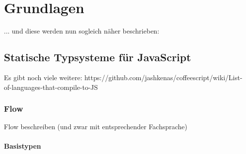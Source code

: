 \chapter{Grundlagen}

... und diese werden nun sogleich näher beschrieben:

\section{Statische Typsysteme für JavaScript}

Es gibt noch viele weitere: https://github.com/jashkenas/coffeescript/wiki/List-of-languages-that-compile-to-JS

\subsection{Flow}
  Flow beschreiben (und zwar mit entsprechender Fachsprache)

\subsubsection{Basistypen}

